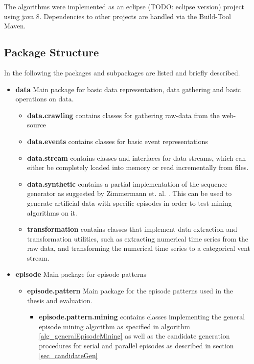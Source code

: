 The algorithms were implemented as an eclipse (TODO: eclipse version) project using java 8. Dependencies to other projects are handled via the Build-Tool Maven. 

\subsection{Package Structure}

In the following the packages and subpackages are listed and briefly described.

\begin{itemize}
	\item \textbf{data} Main package for basic data representation, data gathering and basic operations on data.
	\begin{itemize}
		\item \textbf{data.crawling} contains classes for gathering raw-data from the web-source
		\item \textbf{data.events} contains classes for basic event representations
		\item \textbf{data.stream} contains classes and interfaces for data streams, which can either be completely loaded into memory or read incrementally from files.
		\item \textbf{data.synthetic} contains a partial implementation of the sequence generator as suggested by Zimmermann et. al. \cite{zimmermann2012generating}. This can be used to generate artificial data with specific episodes in order to test mining algorithms on it.
		\item \textbf{transformation} contains classes that implement data extraction and transformation utilities, such as extracting numerical time series from the raw data, and transforming the numerical time series to a categorical vent stream.
	\end{itemize}
	\item \textbf{episode} Main package for episode patterns
	\begin{itemize}
		\item \textbf{episode.pattern} Main package for the episode patterns used in the thesis and evaluation.
		\begin{itemize}
			\item \textbf{episode.pattern.mining} contains classes implementing the general episode mining algorithm as specified in algorithm \ref{alg_generalEpisodeMining} as well as the candidate generation procedures for serial and parallel episodes as described in section \ref{sec_candidateGen}

\end{itemize}
\end{itemize}
\end{itemize}

